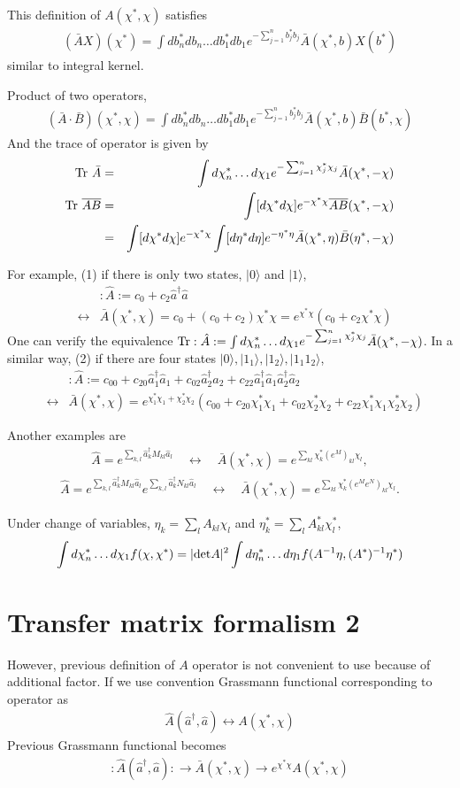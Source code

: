 \documentclass[10pt]{book}
\newcommand{\bea}{\begin{eqnarray}}
\newcommand{\eea}{\end{eqnarray}}
\newcommand{\no}{\nonumber \\}
\def\ra{\rangle}
\begin{document}
This definition of $A(\chi^*,\chi)$ satisfies
\bea 
(\bar{A}X)(\chi^*)=\int db_n^* db_n\dots db_1^* db_1 e^{-\sum_{j=1}^n b_j^* b_j}
             \bar{A}(\chi^*,b)X(b^*)  
\eea 
similar to integral kernel.

Product of two operators,
\bea 
(\bar{A}\cdot \bar{B})(\chi^*,\chi)
=\int db_n^* db_n\dots db_1^* db_1 e^{-\sum_{j=1}^n b_j^* b_j}
      \bar{A}(\chi^*,b)\bar{B}(b^*,\chi)
\eea 
And the trace of operator is given by
\bea
{\rm Tr}\ \bar{A} &=&\int d\chi^*_n\dots d\chi_1 e^{-\sum_{j=1}^n \chi^*_j\chi_j}
             \bar{A}(\chi^*,-\chi)\no  
{\rm Tr}\ \overline{AB}&=&
 \int [d\chi^* d\chi] e^{-\chi^*\chi} \overline{AB}(\chi^*,-\chi) \no 
            &=&\int[d\chi^* d\chi] e^{-\chi^*\chi}
               \int[d\eta^* d\eta] e^{-\eta^*\eta} \bar{A}(\chi^*,\eta)\bar{B}(\eta^*,-\chi)              
\eea

For example, 
(1) if there is only two states, $|0\ra$ and $|1\ra$,
\bea 
& &:\hat{A}:=c_0+c_2\hat{a}^\dagger\hat{a} \no 
&\leftrightarrow& 
\bar{A}(\chi^*,\chi)=c_0+(c_0+c_2)\chi^*\chi=e^{\chi^*\chi}(c_0+c_2\chi^*\chi)
\eea 
One can verify the equivalence ${\rm Tr}:\hat{A}:=\int d\chi^*_n\dots d\chi_1 e^{-\sum_{j=1}^n \chi^*_j\chi_j}
\bar{A}(\chi^*,-\chi)$.
In a similar way, (2) if there are four states $|0\ra,|1_1\ra,|1_2\ra,|1_1 1_2\ra$,
\bea 
& &:\hat{A}:=c_{00}+c_{20}\hat{a}_1^\dagger\hat{a}_1
+c_{02}\hat{a}_2^\dagger\hat{a}_2+c_{22}\hat{a}_1^\dagger\hat{a}_1\hat{a}_2^\dagger\hat{a}_2\no 
&\leftrightarrow& 
\bar{A}(\chi^*,\chi)=e^{\chi^*_1\chi_1+\chi^*_2\chi_2}
(c_{00}+c_{20}\chi^*_1\chi_1+c_{02}\chi^*_2\chi_2+c_{22}\chi^*_1\chi_1\chi^*_2\chi_2)
\eea

Another examples are  
\bea 
\hat{A}=e^{\sum_{k,l} \hat{a}^\dagger_k M_{kl} \hat{a}_l}  \quad  
\leftrightarrow \quad \bar{A}(\chi^*,\chi)=e^{\sum_{kl} \chi_k^* (e^M)_{kl} \chi_l},
\eea
\bea 
\hat{A}=e^{\sum_{k,l} \hat{a}^\dagger_k M_{kl} \hat{a}_l}
          e^{\sum_{k,l} \hat{a}^\dagger_k N_{kl} \hat{a}_l} \quad
\leftrightarrow \quad \bar{A}(\chi^*,\chi)=e^{\sum_{kl} \chi_k^* (e^M e^N)_{kl} \chi_l}.
\eea 

Under change of variables,
$\eta_k=\sum_l A_{kl} \chi_l$ and $\eta^*_k=\sum_l A^*_{kl} \chi^*_l$,
\bea
\int d\chi^*_n\dots d\chi_1 f(\chi,\chi^*)
    =|{\rm det} A|^2 \int d\eta^*_n\dots d\eta_1 f(A^{-1}\eta,(A^*)^{-1}\eta^*)
\eea  

\section{Transfer matrix formalism 2}
However, previous definition of $A$ operator is not convenient to use
because of additional factor. If we use convention 
Grassmann functional corresponding to 
operator as
\bea 
\hat{A}(\hat{a}^\dagger,\hat{a}) \leftrightarrow A(\chi^*,\chi)
\eea
Previous Grassmann functional becomes
\bea 
:\hat{A}(\hat{a}^\dagger,\hat{a}):\to 
\bar{A}(\chi^*,\chi)\to e^{\chi^*\chi} A(\chi^*,\chi)
\eea 
  
\end{document}
